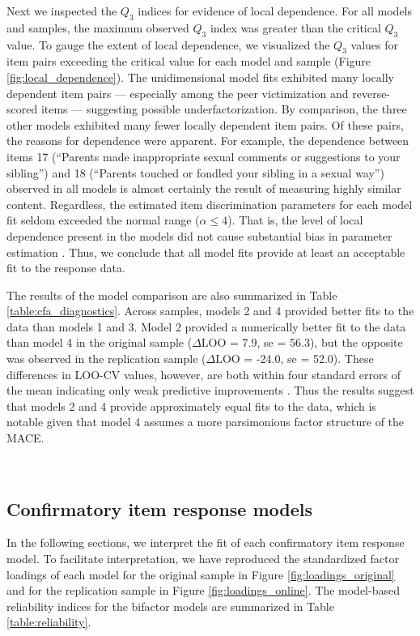 \documentclass[letterpaper,man,natbib,noextraspace,floatsintext,longtable]{apa6}
\begin{document}
Next we inspected the $Q_3$ indices for evidence of local dependence. For all models and samples, the maximum observed $Q_3$ index was greater than the critical $Q_3$ value. To gauge the extent of local dependence, we visualized the $Q_3$ values for item pairs exceeding the critical value for each model and sample (Figure \ref{fig:local_dependence}). The unidimensional model fits exhibited many locally dependent item pairs --- especially among the peer victimization and reverse-scored items --- suggesting possible underfactorization. By comparison, the three other models exhibited many fewer locally dependent item pairs. Of these pairs, the reasons for dependence were apparent. For example, the dependence between items 17 (``Parents made inappropriate sexual comments or suggestions to your sibling'') and 18 (``Parents touched or fondled your sibling in a sexual way'') observed in all models is almost certainly the result of measuring highly similar content. Regardless, the estimated item discrimination parameters for each model fit seldom exceeded the normal range ($\alpha \leq 4$). That is, the level of local dependence present in the models did not cause substantial bias in parameter estimation \citep{edwards2018diagnostic}. Thus, we conclude that all model fits provide at least an acceptable fit to the response data.

The results of the model comparison are also summarized in Table \ref{table:cfa_diagnostics}. Across samples, models 2 and 4 provided better fits to the data than models 1 and 3. Model 2 provided a numerically better fit to the data than model 4 in the original sample ($\Delta \text{LOO}$ = 7.9, se = 56.3), but the opposite was observed in the replication sample ($\Delta \text{LOO}$ = -24.0, se = 52.0). These differences in LOO-CV values, however, are both within four standard errors of the mean indicating only weak predictive improvements \citep{vehtari2022cv}. Thus the results suggest that models 2 and 4 provide approximately equal fits to the data, which is notable given that model 4 assumes a more parsimonious factor structure of the MACE.

{\begin{spacing}{0.2} \hfill \\ \end{spacing}} \subsection{Confirmatory item response models}

In the following sections, we interpret the fit of each confirmatory item response model. To facilitate interpretation, we have reproduced the standardized factor loadings of each model for the original sample in Figure \ref{fig:loadings_original} and for the replication sample in Figure \ref{fig:loadings_online}. The model-based reliability indices for the bifactor models are summarized in Table \ref{table:reliability}. 
\end{document}
